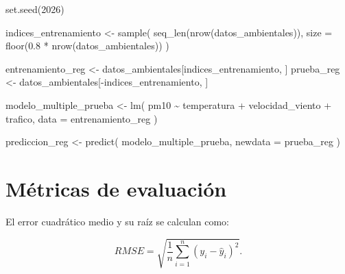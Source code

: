 \documentclass[
  spanish,
  10.5pt,
  letterpaper,
  openany,
  headings=big]{scrbook}
\newenvironment{Shaded}{}{}
\newcommand{\AttributeTok}[1]{\textcolor[rgb]{0.84,0.23,0.29}{#1}}
\newcommand{\DecValTok}[1]{\textcolor[rgb]{0.00,0.36,0.77}{#1}}
\newcommand{\FloatTok}[1]{\textcolor[rgb]{0.00,0.36,0.77}{#1}}
\newcommand{\FunctionTok}[1]{\textcolor[rgb]{0.44,0.26,0.76}{#1}}
\newcommand{\NormalTok}[1]{\textcolor[rgb]{0.14,0.16,0.18}{#1}}
\newcommand{\OtherTok}[1]{\textcolor[rgb]{0.44,0.26,0.76}{#1}}
\newcommand{\SpecialCharTok}[1]{\textcolor[rgb]{0.00,0.36,0.77}{#1}}
\newcommand{\StringTok}[1]{\textcolor[rgb]{0.01,0.18,0.38}{#1}}
\begin{document}
\begin{Shaded}
\begin{Highlighting}[]
\FunctionTok{set.seed}\NormalTok{(}\DecValTok{2026}\NormalTok{)}

\NormalTok{indices\_entrenamiento }\OtherTok{\textless{}{-}} \FunctionTok{sample}\NormalTok{(}
  \FunctionTok{seq\_len}\NormalTok{(}\FunctionTok{nrow}\NormalTok{(datos\_ambientales)),}
  \AttributeTok{size =} \FunctionTok{floor}\NormalTok{(}\FloatTok{0.8} \SpecialCharTok{*} \FunctionTok{nrow}\NormalTok{(datos\_ambientales))}
\NormalTok{)}

\NormalTok{entrenamiento\_reg }\OtherTok{\textless{}{-}}\NormalTok{ datos\_ambientales[indices\_entrenamiento, ]}
\NormalTok{prueba\_reg }\OtherTok{\textless{}{-}}\NormalTok{ datos\_ambientales[}\SpecialCharTok{{-}}\NormalTok{indices\_entrenamiento, ]}

\NormalTok{modelo\_multiple\_prueba }\OtherTok{\textless{}{-}} \FunctionTok{lm}\NormalTok{(}
\NormalTok{  pm10 }\SpecialCharTok{\textasciitilde{}}\NormalTok{ temperatura }\SpecialCharTok{+}\NormalTok{ velocidad\_viento }\SpecialCharTok{+}\NormalTok{ trafico,}
  \AttributeTok{data =}\NormalTok{ entrenamiento\_reg}
\NormalTok{)}

\NormalTok{prediccion\_reg }\OtherTok{\textless{}{-}} \FunctionTok{predict}\NormalTok{(}
\NormalTok{  modelo\_multiple\_prueba,}
  \AttributeTok{newdata =}\NormalTok{ prueba\_reg}
\NormalTok{)}
\end{Highlighting}
\end{Shaded}

\section{Métricas de evaluación}\label{muxe9tricas-de-evaluaciuxf3n}

El error cuadrático medio y su raíz se calculan como:

\[
RMSE = \sqrt{\frac{1}{n}\sum_{i=1}^{n}(y_i-\widehat{y}_i)^2}.
\]

\begin{Shaded}
\end{Shaded}
\end{document}
